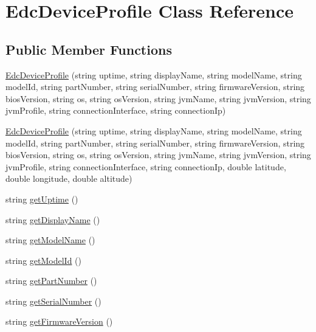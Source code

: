 \hypertarget{class_edc_device_profile}{\section{Edc\-Device\-Profile Class Reference}
\label{class_edc_device_profile}
}
\subsection*{Public Member Functions}
\begin{DoxyCompactItemize}
\item 
\hyperlink{class_edc_device_profile_adfc6207df0fb731a6461ea9fb551269e}{Edc\-Device\-Profile} (string uptime, string display\-Name, string model\-Name, string model\-Id, string part\-Number, string serial\-Number, string firmware\-Version, string bios\-Version, string os, string os\-Version, string jvm\-Name, string jvm\-Version, string jvm\-Profile, string connection\-Interface, string connection\-Ip)
\item 
\hyperlink{class_edc_device_profile_a955dad131de821208edf343232042de1}{Edc\-Device\-Profile} (string uptime, string display\-Name, string model\-Name, string model\-Id, string part\-Number, string serial\-Number, string firmware\-Version, string bios\-Version, string os, string os\-Version, string jvm\-Name, string jvm\-Version, string jvm\-Profile, string connection\-Interface, string connection\-Ip, double latitude, double longitude, double altitude)
\item 
string \hyperlink{class_edc_device_profile_a6dbe7f1f143a02383f9e659754f0fa36}{get\-Uptime} ()
\item 
string \hyperlink{class_edc_device_profile_a90c921f18f5a324e3e26d9eae56b6f40}{get\-Display\-Name} ()
\item 
string \hyperlink{class_edc_device_profile_ad7fae191175be1b3dfeab714152be8f4}{get\-Model\-Name} ()
\item 
string \hyperlink{class_edc_device_profile_aed831d30e58b8b0deba851e1c7d6cf06}{get\-Model\-Id} ()
\item 
string \hyperlink{class_edc_device_profile_a8080cfb751b58625275bb96484882a12}{get\-Part\-Number} ()
\item 
string \hyperlink{class_edc_device_profile_a2288377f6719618b30a2d90bb26cbfed}{get\-Serial\-Number} ()
\item 
string \hyperlink{class_edc_device_profile_a74ebfa8175554a183552b54654c3a401}{get\-Firmware\-Version} ()
\item 

\end{DoxyCompactItemize}
